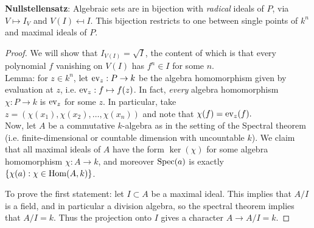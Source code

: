 \documentclass{amsart}
\begin{document}
\textbf{Nullstellensatz}: Algebraic sets are in bijection with \textit{radical} ideals of $P$, via $V \mapsto I_V$ and $V(I) \mapsfrom I$. This bijection restricts to one between single points of $k^n$ and maximal ideals of $P$.
\begin{proof}
	We will show that $I_{V(I)}=\sqrt{I}$, the content of which is that every polynomial $f$ vanishing on $V(I)$ has $f^n\in I$ for some $n$.\\
	
	Lemma: for $z\in k^n$, let $\operatorname{ev}_z:P\to k$ be the algebra homomorphism given by evaluation at $z$, i.e. $\operatorname{ev}_z: f\mapsto f(z)$. In fact, \textit{every} algebra homomorphism $\chi: P\to k$ is $\operatorname{ev}_z$ for some $z$. In particular, take $z=(\chi(x_1),\chi(x_2),\dots,\chi(x_n))$ and note that $\chi(f) = \operatorname{ev}_z(f).$\\
	
	Now, let $A$ be a commutative $k$-algebra as in the setting of the Spectral theorem (i.e. finite-dimensional or countable dimension with uncountable $k$). We claim that all maximal ideals of $A$ have the form $\ker(\chi)$ for some algebra homomorphism $\chi: A \to k$, and moreover $\operatorname{Spec}(a)$ is exactly $\{\chi(a) : \chi\in \operatorname{Hom}(A,k)\}$.
	
	To prove the first statement: let $I\subset A$ be a maximal ideal. This implies that $A/I$ is a field, and in particular a division algebra, so the spectral theorem implies that $A/I=k$. Thus the projection onto $I$ gives a character $A\to A/I=k$.
	
	
\end{proof}
\end{document}
